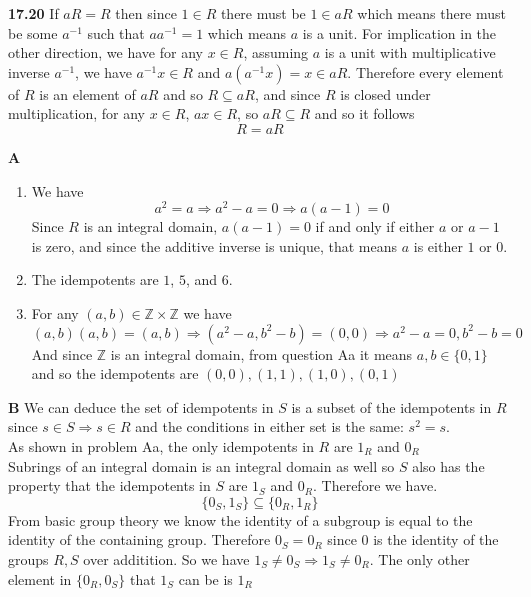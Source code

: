 \documentclass[12pt]{article}
\newenvironment{ques}{\vspace{2 ex}}{\vspace{2 ex}}
\theoremstyle{definition}
\begin{document}
\begin{ques}
	\textbf{17.20}
	If $aR = R$ then since $1 \in R$ there must be $1 \in aR$ which means
	there must be some $a^{-1}$ such that $aa^{-1} =1$ which means $a$ is a
	unit. For implication in the other direction, we have for any $x \in
	R$, assuming $a$ is a unit with multiplicative inverse $a^{-1}$, we
	have $a^{-1}x \in R$ and $a (a^{-1}x) = x \in aR$. Therefore every element of
	$R$ is an element of $aR$ and so $R \subseteq aR$, and since $R$ is
	closed under multiplication, for any $x \in R$, $ax \in R$, so $aR
	\subseteq R$ and so it follows 
	$$R = aR$$
\end{ques}

\begin{ques}
	\textbf{A}
	\begin{enumerate}
		\item
		We have
		$$a^2 = a \Rightarrow a^2 - a = 0 \Rightarrow a(a - 1) = 0$$
		Since $R$ is an integral domain, $a(a-1) = 0$ if and only if
		either $a$ or $a-1$ is zero, and since the additive inverse is
		unique, that means $a$ is either $1$ or $0$.
		\item
		The idempotents are $1$, $5$, and $6$.
		\item
		For any $(a,b) \in
		\mathbb Z \times \mathbb Z$ we have 
		$$(a, b)(a, b) = (a, b) \Rightarrow (a^2 - a, b^2 - b) = (0,0)
		\Rightarrow a^2 - a =0, b^2 - b = 0$$
		And since $\mathbb Z$ is an integral domain, from question Aa it means $a,b
		\in \{0, 1\}$ and so the idempotents are $(0,0), (1,1), (1,0),
		(0,1)$
	\end{enumerate}
\end{ques}

\begin{ques}
	\textbf{B}
	We can deduce the set of idempotents in $S$ is a subset of
	the idempotents in $R$ since $s \in S \Rightarrow s \in R$ and the
	conditions in either set is the same: $s^2 = s$.\\
	As shown in problem Aa, the only idempotents in $R$ are $1_R$ and $0_R$\\
	Subrings of an integral domain is an integral domain as well so $S$
	also has the property that the idempotents in $S$ are $1_S$ and $0_R$.
	Therefore we have.
	$$\{0_S, 1_S\} \subseteq \{0_R, 1_R\}$$
	From basic group theory we know the identity of a subgroup is equal to
	the identity of the containing group. Therefore $0_S = 0_R$ since $0$
	is the identity of the groups $R, S$ over additition. So we have $1_S
	\neq 0_S \Rightarrow 1_S \neq 0_R$. The only other element in $\{0_R,
	0_S\}$ that $1_S$ can be is $1_R$
\end{ques}
\end{document}
